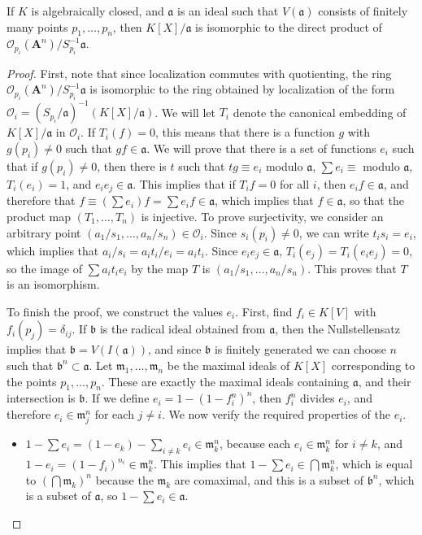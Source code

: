\begin{theorem}
    If $K$ is algebraically closed, and $\mathfrak{a}$ is an ideal such that $V(\mathfrak{a})$ consists of finitely many points $p_1, \dots, p_n$, then $K[X]/\mathfrak{a}$ is isomorphic to the direct product of $\mathcal{O}_{p_i}(\mathbf{A}^n)/S_{p_i}^{-1} \mathfrak{a}$.
\end{theorem}
\begin{proof}
    First, note that since localization commutes with quotienting, the ring $\mathcal{O}_{p_i}(\mathbf{A}^n)/S_{p_i}^{-1} \mathfrak{a}$ is isomorphic to the ring obtained by localization of the form $\mathcal{O}_i = (S_{p_i}/\mathfrak{a})^{-1}(K[X]/\mathfrak{a})$. We will let $T_i$ denote the canonical embedding of $K[X]/\mathfrak{a}$ in $\mathcal{O}_i$. If $T_i(f) = 0$, this means that there is a function $g$ with $g(p_i) \neq 0$ such that $gf \in \mathfrak{a}$. We will prove that there is a set of functions $e_i$ such that if $g(p_i) \neq 0$, then there is $t$ such that $tg \equiv e_i$ modulo $\mathfrak{a}$, $\sum e_i \equiv $ modulo $\mathfrak{a}$, $T_i(e_i) = 1$, and $e_ie_j \in \mathfrak{a}$. This implies that if $T_if = 0$ for all $i$, then $e_if \in \mathfrak{a}$, and therefore that $f \equiv (\sum e_i)f = \sum e_if \in \mathfrak{a}$, which implies that $f \in \mathfrak{a}$, so that the product map $(T_1, \dots, T_n)$ is injective. To prove surjectivity, we consider an arbitrary point $(a_1/s_1, \dots, a_n/s_n) \in \mathcal{O}_i$. Since $s_i(p_i) \neq 0$, we can write $t_is_i = e_i$, which implies that $a_i/s_i = a_it_i/e_i = a_it_i$. Since $e_ie_j \in \mathfrak{a}$, $T_i(e_j) = T_i(e_ie_j) = 0$, so the image of $\sum a_it_ie_i$ by the map $T$ is $(a_1/s_1, \dots, a_n/s_n)$. This proves that $T$ is an isomorphism.

    To finish the proof, we construct the values $e_i$. First, find $f_i \in K[V]$ with $f_i(p_j) = \delta_{ij}$. If $\mathfrak{b}$ is the radical ideal obtained from $\mathfrak{a}$, then the Nullstellensatz implies that $\mathfrak{b} = V(I(\mathfrak{a}))$, and since $\mathfrak{b}$ is finitely generated we can choose $n$ such that $\mathfrak{b}^n \subset \mathfrak{a}$. Let $\mathfrak{m}_1, \dots, \mathfrak{m}_n$ be the maximal ideals of $K[X]$ corresponding to the points $p_1, \dots, p_n$. These are exactly the maximal ideals containing $\mathfrak{a}$, and their intersection is $\mathfrak{b}$. If we define $e_i = 1 - (1 - f_i^n)^n$, then $f_i^n$ divides $e_i$, and therefore $e_i \in \mathfrak{m}_j^n$ for each $j \neq i$. We now verify the required properties of the $e_i$.
    \begin{itemize}
        \item $1 - \sum e_i = (1 - e_k) - \sum_{i \neq k} e_i \in \mathfrak{m}_k^n$, because each $e_i \in \mathfrak{m}_k^n$ for $i \neq k$, and $1 - e_i = (1 - f_i)^{n_i} \in \mathfrak{m}_k^n$. This implies that $1 - \sum e_i \in \bigcap \mathfrak{m}_k^n$, which is equal to $(\bigcap \mathfrak{m}_k)^n$ because the $\mathfrak{m}_k$ are comaximal, and this is a subset of $\mathfrak{b}^n$, which is a subset of $\mathfrak{a}$, so $1 - \sum e_i \in \mathfrak{a}$.


\end{itemize}
\end{proof}
